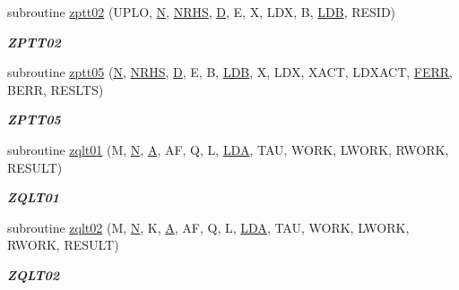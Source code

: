 \begin{DoxyCompactItemize}
subroutine \hyperlink{group__complex16__lin_ga6e6412523426133ae9c135f64e703a95}{zptt02} (U\+P\+L\+O, \hyperlink{polmisc_8c_a0240ac851181b84ac374872dc5434ee4}{N}, \hyperlink{example__user_8c_aa0138da002ce2a90360df2f521eb3198}{N\+R\+H\+S}, \hyperlink{odrpack_8h_a7dae6ea403d00f3687f24a874e67d139}{D}, E, X, L\+D\+X, B, \hyperlink{example__user_8c_a50e90a7104df172b5a89a06c47fcca04}{L\+D\+B}, R\+E\+S\+I\+D)
\begin{DoxyCompactList}\small\item\em {\bfseries Z\+P\+T\+T02} \end{DoxyCompactList}\item 
subroutine \hyperlink{group__complex16__lin_ga7273d40341f04571be0238316241bf1c}{zptt05} (\hyperlink{polmisc_8c_a0240ac851181b84ac374872dc5434ee4}{N}, \hyperlink{example__user_8c_aa0138da002ce2a90360df2f521eb3198}{N\+R\+H\+S}, \hyperlink{odrpack_8h_a7dae6ea403d00f3687f24a874e67d139}{D}, E, B, \hyperlink{example__user_8c_a50e90a7104df172b5a89a06c47fcca04}{L\+D\+B}, X, L\+D\+X, X\+A\+C\+T, L\+D\+X\+A\+C\+T, \hyperlink{superlu__enum__consts_8h_af00a42ecad444bbda75cde1b64bd7e72a78fd14d7abebae04095cfbe02928f153}{F\+E\+R\+R}, B\+E\+R\+R, R\+E\+S\+L\+T\+S)
\begin{DoxyCompactList}\small\item\em {\bfseries Z\+P\+T\+T05} \end{DoxyCompactList}\item 
subroutine \hyperlink{group__complex16__lin_ga4cc0ba067dc31156572387f8ee82cd98}{zqlt01} (M, \hyperlink{polmisc_8c_a0240ac851181b84ac374872dc5434ee4}{N}, \hyperlink{classA}{A}, A\+F, Q, L, \hyperlink{example__user_8c_ae946da542ce0db94dced19b2ecefd1aa}{L\+D\+A}, T\+A\+U, W\+O\+R\+K, L\+W\+O\+R\+K, R\+W\+O\+R\+K, R\+E\+S\+U\+L\+T)
\begin{DoxyCompactList}\small\item\em {\bfseries Z\+Q\+L\+T01} \end{DoxyCompactList}\item 
subroutine \hyperlink{group__complex16__lin_gadf167db59219f155d9683f0a0eb95f34}{zqlt02} (M, \hyperlink{polmisc_8c_a0240ac851181b84ac374872dc5434ee4}{N}, K, \hyperlink{classA}{A}, A\+F, Q, L, \hyperlink{example__user_8c_ae946da542ce0db94dced19b2ecefd1aa}{L\+D\+A}, T\+A\+U, W\+O\+R\+K, L\+W\+O\+R\+K, R\+W\+O\+R\+K, R\+E\+S\+U\+L\+T)
\begin{DoxyCompactList}\small\item\em {\bfseries Z\+Q\+L\+T02} \end{DoxyCompactList}\item 

\end{DoxyCompactItemize}
